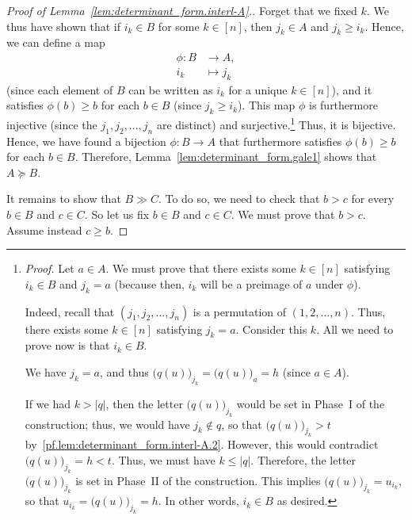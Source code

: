 \documentclass[reqno]{amsart}
\newcommand{\0}{\phantom{c}}
\newcommand{\abs}[1]{\left| #1 \right|}
\newcommand{\tup}[1]{\left( #1 \right)}
\newcommand{\ive}[1]{\left[ #1 \right]}
\theoremstyle{plain}
\theoremstyle{definition}
\numberwithin{equation}{section}
\begin{document}
\begin{proof}[Proof of Lemma~\ref{lem:determinant_form.interl-A}.]
Forget that we fixed $k$. We thus have shown that if $i_k\in B$ for some $k \in \ive{n} $, then $j_k\in A$ and $j_k\geq i_k$.
Hence, we can define a map
\begin{align*}
\phi \colon B & \to A, \\
i_k & \mapsto j_k
\end{align*}
(since each element of $B$ can be written as $i_k$ for a unique $k\in \ive{n} $), and it satisfies $\phi(b) \geq b$ for each $b \in B$ (since $j_k \geq i_k$).
This map $\phi $ is furthermore injective (since the $j_1, j_2, \dotsc, j_n$ are distinct) and surjective.\footnote{\textit{Proof.}
  Let $a\in A$.
  We must prove that there exists some $k\in \ive{n}$ satisfying $i_k \in B$ and $j_k = a$ (because then, $i_k$ will be a preimage of $a$ under $\phi$).
  \par
  Indeed, recall that $\left( j_1,j_2,\ldots ,j_n\right) $ is a permutation of $\tup{1, 2, \dotsc, n}$.
  Thus, there exists some $k \in \ive{n} $ satisfying $j_k = a$.
  Consider this $k$.
  All we need to prove now is that $i_k\in B$.
  \par
  We have $j_k = a$, and thus $\bigl( q(u) \bigr)_{j_k} = \bigl( q(u) \bigr)_a = h$ (since $a \in A$).
  \par
  If we had $k > \abs{q}$, then the letter $\bigl( q(u) \bigr)_{j_k}$ would be set in Phase~I of the construction;
  thus, we would have $j_k\notin q$, so that $\bigl( q(u) \bigr)_{j_k} > t$ by~\eqref{pf.lem:determinant_form.interl-A.2}.
  However, this would contradict $\bigl( q(u) \bigr)_{j_k} = h < t$.
  Thus, we must have $k \leq \abs{q}$.
  Therefore, the letter $\bigl( q(u) \bigr)_{j_k}$ is set in Phase~II of the construction.
  This implies $\bigl( q(u) \bigr)_{j_k} = u_{i_k}$, so that $u_{i_k} = \bigl( q(u) \bigr)_{j_k} = h$.
  In other words, $i_k \in B$ as desired.}
Thus, it is bijective. Hence, we have found a bijection
$\phi \colon B \to A$ that furthermore satisfies $\phi(b) \geq b$ for each $b\in B$.
Therefore, Lemma~\ref{lem:determinant_form.gale1} shows that $A \succeq B$.

It remains to show that $B \gg C$.
To do so, we need to check that $b > c$ for every $b \in B$ and $c \in C$.
So let us fix $b \in B$ and $c \in C$.
We must prove that $b > c$. Assume instead $c \geq b$.


\end{proof}
\end{document}
